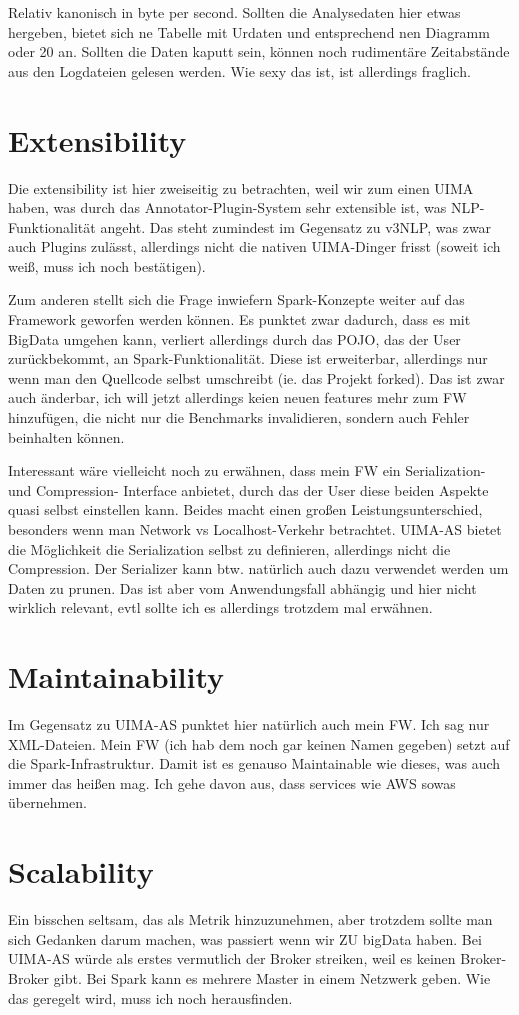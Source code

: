Relativ kanonisch in byte per second. Sollten die Analysedaten hier etwas hergeben, bietet sich ne Tabelle mit Urdaten und entsprechend nen Diagramm oder 20 an. Sollten die Daten kaputt sein, können noch rudimentäre Zeitabstände aus den Logdateien gelesen werden. Wie sexy das ist, ist allerdings fraglich.

\section{Extensibility}

Die extensibility ist hier zweiseitig zu betrachten, weil wir zum einen UIMA haben, was durch das Annotator-Plugin-System sehr extensible ist, was NLP-Funktionalität angeht. Das steht zumindest im Gegensatz zu v3NLP, was zwar auch Plugins zulässt, allerdings nicht die nativen UIMA-Dinger frisst (soweit ich weiß, muss ich noch bestätigen).

Zum anderen stellt sich die Frage inwiefern Spark-Konzepte weiter auf das Framework geworfen werden können. Es punktet zwar dadurch, dass es mit BigData umgehen kann, verliert allerdings durch das POJO, das der User zurückbekommt, an Spark-Funktionalität. Diese ist erweiterbar, allerdings nur wenn man den Quellcode selbst umschreibt (ie. das Projekt forked). Das ist zwar auch änderbar, ich will jetzt allerdings keien neuen features mehr zum FW hinzufügen, die nicht nur die Benchmarks invalidieren, sondern auch Fehler beinhalten können.

Interessant wäre vielleicht noch zu erwähnen, dass mein FW ein Serialization- und Compression- Interface anbietet, durch das der User diese beiden Aspekte quasi selbst einstellen kann. Beides macht einen großen Leistungsunterschied, besonders wenn man Network vs Localhost-Verkehr betrachtet. UIMA-AS bietet die Möglichkeit die Serialization selbst zu definieren, allerdings nicht die Compression. Der Serializer kann btw. natürlich auch dazu verwendet werden um Daten zu prunen. Das ist aber vom Anwendungsfall abhängig und hier nicht wirklich relevant, evtl sollte ich es allerdings trotzdem mal erwähnen.

\section{Maintainability}

Im Gegensatz zu UIMA-AS punktet hier natürlich auch mein FW. Ich sag nur XML-Dateien.
Mein FW (ich hab dem noch gar keinen Namen gegeben) setzt auf die Spark-Infrastruktur. Damit ist es genauso Maintainable wie dieses, was auch immer das heißen mag. Ich gehe davon aus, dass services wie AWS sowas übernehmen.

\section{Scalability}

Ein bisschen seltsam, das als Metrik hinzuzunehmen, aber trotzdem sollte man sich Gedanken darum machen, was passiert wenn wir ZU bigData haben. Bei UIMA-AS würde als erstes vermutlich der Broker streiken, weil es keinen Broker-Broker gibt. Bei Spark kann es mehrere Master in einem Netzwerk geben. Wie das geregelt wird, muss ich noch herausfinden.